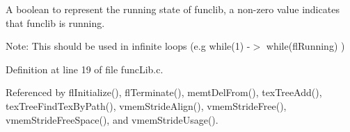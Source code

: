 A boolean to represent the running state of funclib, a non-zero value indicates that funclib is running. 

\begin{Desc}
\item[Note:]This should be used in infinite loops (e.g while(1) -$>$ while(fl\-Running) ) \end{Desc}


Definition at line 19 of file func\-Lib.c.

Referenced by fl\-Initialize(), fl\-Terminate(), memt\-Del\-From(), tex\-Tree\-Add(), tex\-Tree\-Find\-Tex\-By\-Path(), vmem\-Stride\-Align(), vmem\-Stride\-Free(), vmem\-Stride\-Free\-Space(), and vmem\-Stride\-Usage().